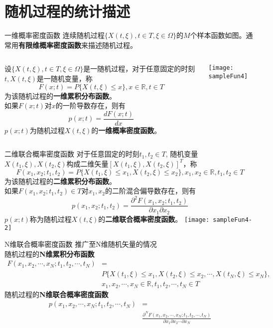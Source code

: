 \section{随机过程的统计描述}

\begin{frame}{一维概率密度函数}
连续随机过程$\{X(t,\xi),t\in T,\xi\in\Omega \}$的$M$个样本函数如图。通常用\textbf{有限维概率密度函数}来描述随机过程。

\medskip
\begin{columns}
	\begin{block}{}
		设$\{X(t,\xi),t\in T,\xi\in\Omega \}$是一随机过程，对于任意固定的时刻$t,X(t,\xi)$是一随机变量，称
		\[F(x;t)=P\{X(t,\xi)\le x\},x\in\mathbb{R},t\in T \]
		为该随机过程的\textbf{一维累积分布函数}。\\
		如果$F(x;t)$对$x$的一阶导数存在，则有
		\[p(x;t)=\frac{dF(x;t)}{dx}\]
		$p(x;t)$为随机过程$X(t,\xi)$的\textbf{一维概率密度函数}。
	\end{block}
	\texttt{[image: sampleFun4]}
\end{columns}
\end{frame}

\begin{frame}{二维联合概率密度函数}
对于任意固定的时刻$t_1,t_2\in T$, 随机变量$X(t_1,\xi),X(t_2,\xi)$构成二维矢量$[X(t_1,\xi),X(t_2,\xi)]^T$，称
\[F(x_1,x_2;t_1,t_2)=P\{X(t_1,\xi)\le x_1,X(t_2,\xi)\le x_2\},x_1,x_2\in\mathbb{R},t_1,t_2\in T \]
为该随机过程的\textbf{二维累积分布函数}。\\
如果$F(x_1,x_2;t_1,t_2)\in T$对$x_1,x_2$的二阶混合偏导数存在，则有
\[p(x_1,x_2;t_1,t_2)=\frac{\partial^2 F(x_1,x_2;t_1,t_2)}{\partial x_1\partial x_2}\]
$p(x;t)$称为随机过程$X(t,\xi)$的\textbf{二维联合概率密度函数}。
\texttt{[image: sampleFun4-2]}
\end{frame}

\begin{frame}{N维联合概率密度函数}
推广至N维随机矢量的情况\\
随机过程的\textbf{N维累积分布函数}
\begin{align*}
F(x_1,x_2,\cdots,x_N;t_1,t_2,\cdots,t_N)&=\\
&P\{X(t_1,\xi)\le x_1,X(t_2,\xi)\le x_2,\cdots,X(t_N,\xi)\le x_N\},&\\
&x_1,x_2,\cdots,x_N\in\mathbb{R},t_1,t_2,\cdots,t_N\in T
\end{align*}
随机过程的\textbf{N维联合概率密度函数}
\begin{align*}
p(x_1,x_2,\cdots,x_N;t_1,t_2,\cdots,t_N)&=\\
&\frac{\partial^N F(x_1,x_2,\cdots,x_N;t_1,t_2,\cdots,t_N)}{\partial x_1\partial x_2\cdots\partial x_N}
\end{align*}
\end{frame}


